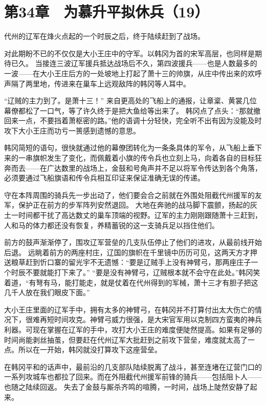 \section{第34章　为慕升平拟休兵（19）}

代州的辽军在烽火点起的一个时辰之后，终于陆续赶到了战场。

对此期盼不已的不仅仅是大小王庄中的守军。以韩冈为首的宋军高层，也同样是期待已久。
当接连三波辽军援兵抵达战场后不久，第四波援兵——也是人数最多的一波——在大小王庄后方的一处坡地上打起了萧十三的帅旗，从庄中传出来的欢呼声隔了两里地，传进来在巢车上远观敌阵的韩冈等人耳中。

“辽贼的主力到了。是萧十三！”
来自更高处的飞船上的通报，让章楶、黄裳几位幕僚都松了一口气，等了许久终于是把大鱼给等出来了。
韩冈点了点头：“那就撤回来一点，不要挡着萧枢密的路。”他的语调十分轻快，完全听不出有因为没能及时攻下大小王庄而功亏一篑感到遗憾的意思。

韩冈简短的语句，很快就通过他的幕僚团转化为一条条具体的军令，从飞船上垂下来的一串旗帜发生了变化，而佩戴着小旗的传令兵也立刻上马，向着各自的目标狂奔而去——在广达数里的战场上，金鼓和号角声并不足以将军令传达到各个角落，必须要通过飞船旗语和传令兵相互印证来保证准确无误的传递。

守在本阵周围的骑兵先一步出动了，他们要会合之前就在外围处阻截代州援军的友军，保护正在前方的步军阵列安然退回。
大地在奔驰的战马脚下震颤，扬起的灰土一时间都干扰了高达数丈的巢车顶端的视野。辽军的主力刚刚跟随萧十三赶到，人和马的体力都还没有恢复，养精蓄锐的这一支骑兵足以挡住他们。

前方的鼓声渐渐停了，围攻辽军营垒的几支队伍停止了他们的进攻，从最前线开始后退。
远眺着前方的两座村庄，辽国的旗帜在千里镜中历历可见，这两天方才押送粮草赶到忻口寨的留光宇不无遗憾：“要是辽贼手上没有神臂弓，那两座庄子一个时辰不要就能打下来了。”
“要是没有神臂弓，辽贼根本就不会守在此处。”韩冈笑着道，“有弩有马，能打能走，就是仗着在代州得到的军械，萧十三才有胆子把这几千人放在我们眼皮下面。”

大小王庄里面的辽军手中，拥有太多的神臂弓，在韩冈并不打算付出太大伤亡的情况下，很难再短时间攻克。神臂弓威力很强，是大宋官军用以克制四方蛮夷的神兵利器。可现在掌握在辽军的手中，攻打大小王庄的难度便陡然提高。如果有足够的时间尚能剥丝抽茧，但要赶在代州辽军大批赶到之前攻下营垒，难度就太高了一点。所以在一开始，韩冈就没打算攻下这座营垒。

在韩冈平和的话声中，最前沿的几支部队陆续脱离了战斗，甚至连堵在辽营门口的一系列攻城车也都拉了回来。而在外阻截代州援军前锋的骑兵——包括阻卜人——也随之陆续回返。
失去了金鼓与厮杀齐鸣的喧腾，一时间，战场上陡然安静了起来。

